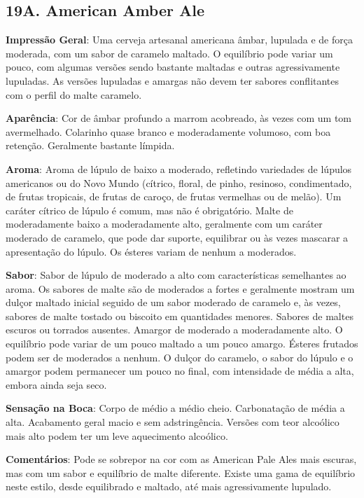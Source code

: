 \subsection*{19A. American Amber Ale}
\textbf{Impressão Geral}: Uma cerveja artesanal americana âmbar, lupulada e de força moderada, com um sabor de caramelo maltado. O equilíbrio pode variar um pouco, com algumas versões sendo bastante maltadas e outras agressivamente lupuladas. As versões lupuladas e amargas não devem ter sabores conflitantes com o perfil do malte caramelo.

\textbf{Aparência}: Cor de âmbar profundo a marrom acobreado, às vezes com um tom avermelhado. Colarinho quase branco e moderadamente volumoso, com boa retenção. Geralmente bastante límpida.

\textbf{Aroma}: Aroma de lúpulo de baixo a moderado, refletindo variedades de lúpulos americanos ou do Novo Mundo (cítrico, floral, de pinho, resinoso, condimentado, de frutas tropicais, de frutas de caroço, de frutas vermelhas ou de melão). Um caráter cítrico de lúpulo é comum, mas não é obrigatório. Malte de moderadamente baixo a moderadamente alto, geralmente com um caráter moderado de caramelo, que pode dar suporte, equilibrar ou às vezes mascarar a apresentação do lúpulo. Os ésteres variam de nenhum a moderados.

\textbf{Sabor}: Sabor de lúpulo de moderado a alto com características semelhantes ao aroma. Os sabores de malte são de moderados a fortes e geralmente mostram um dulçor maltado inicial seguido de um sabor moderado de caramelo e, às vezes, sabores de malte tostado ou biscoito em quantidades menores. Sabores de maltes escuros ou torrados ausentes. Amargor de moderado a moderadamente alto. O equilíbrio pode variar de um pouco maltado a um pouco amargo. Ésteres frutados podem ser de moderados a nenhum. O dulçor do caramelo, o sabor do lúpulo e o amargor podem permanecer um pouco no final, com intensidade de média a alta, embora ainda seja seco.

\textbf{Sensação na Boca}: Corpo de médio a médio cheio. Carbonatação de média a alta. Acabamento geral macio e sem adstringência. Versões com teor alcoólico mais alto podem ter um leve aquecimento alcoólico.

\textbf{Comentários}: Pode se sobrepor na cor com as American Pale Ales mais escuras, mas com um sabor e equilíbrio de malte diferente. Existe uma gama de equilíbrio neste estilo, desde equilibrado e maltado, até mais agressivamente lupulado.

